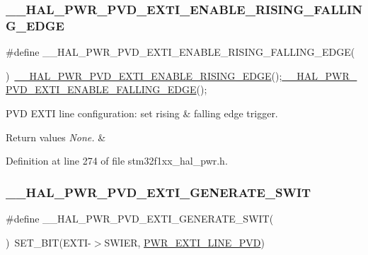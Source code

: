 \subsubsection{\texorpdfstring{\+\_\+\+\_\+\+H\+A\+L\+\_\+\+P\+W\+R\+\_\+\+P\+V\+D\+\_\+\+E\+X\+T\+I\+\_\+\+E\+N\+A\+B\+L\+E\+\_\+\+R\+I\+S\+I\+N\+G\+\_\+\+F\+A\+L\+L\+I\+N\+G\+\_\+\+E\+D\+GE}{\_\_HAL\_PWR\_PVD\_EXTI\_ENABLE\_RISING\_FALLING\_EDGE}}
{\footnotesize\ttfamily \#define \+\_\+\+\_\+\+H\+A\+L\+\_\+\+P\+W\+R\+\_\+\+P\+V\+D\+\_\+\+E\+X\+T\+I\+\_\+\+E\+N\+A\+B\+L\+E\+\_\+\+R\+I\+S\+I\+N\+G\+\_\+\+F\+A\+L\+L\+I\+N\+G\+\_\+\+E\+D\+GE(\begin{DoxyParamCaption}{ }\end{DoxyParamCaption})~\hyperlink{group___p_w_r___exported___macros_ga7bef3f30c9fe267c99d5240fbf3f878c}{\+\_\+\+\_\+\+H\+A\+L\+\_\+\+P\+W\+R\+\_\+\+P\+V\+D\+\_\+\+E\+X\+T\+I\+\_\+\+E\+N\+A\+B\+L\+E\+\_\+\+R\+I\+S\+I\+N\+G\+\_\+\+E\+D\+GE}();\hyperlink{group___p_w_r___exported___macros_ga5b971478563a00e1ee1a9d8ca8054e08}{\+\_\+\+\_\+\+H\+A\+L\+\_\+\+P\+W\+R\+\_\+\+P\+V\+D\+\_\+\+E\+X\+T\+I\+\_\+\+E\+N\+A\+B\+L\+E\+\_\+\+F\+A\+L\+L\+I\+N\+G\+\_\+\+E\+D\+GE}();}



P\+VD E\+X\+TI line configuration\+: set rising \& falling edge trigger. 


\begin{DoxyRetVals}{Return values}
{\em None.} & \\
\hline
\end{DoxyRetVals}


Definition at line 274 of file stm32f1xx\+\_\+hal\+\_\+pwr.\+h.

\mbox{\label{group___p_w_r___exported___macros_gaba4a7968f5c4c4ca6a7047b147ba18d4}} 
\subsubsection{\texorpdfstring{\+\_\+\+\_\+\+H\+A\+L\+\_\+\+P\+W\+R\+\_\+\+P\+V\+D\+\_\+\+E\+X\+T\+I\+\_\+\+G\+E\+N\+E\+R\+A\+T\+E\+\_\+\+S\+W\+IT}{\_\_HAL\_PWR\_PVD\_EXTI\_GENERATE\_SWIT}}
{\footnotesize\ttfamily \#define \+\_\+\+\_\+\+H\+A\+L\+\_\+\+P\+W\+R\+\_\+\+P\+V\+D\+\_\+\+E\+X\+T\+I\+\_\+\+G\+E\+N\+E\+R\+A\+T\+E\+\_\+\+S\+W\+IT(\begin{DoxyParamCaption}{ }\end{DoxyParamCaption})~S\+E\+T\+\_\+\+B\+IT(E\+X\+TI-\/$>$S\+W\+I\+ER, \hyperlink{group___p_w_r___private___constants_ga43a49255649e03d2d2b6b12c5c379d2b}{P\+W\+R\+\_\+\+E\+X\+T\+I\+\_\+\+L\+I\+N\+E\+\_\+\+P\+VD})}




